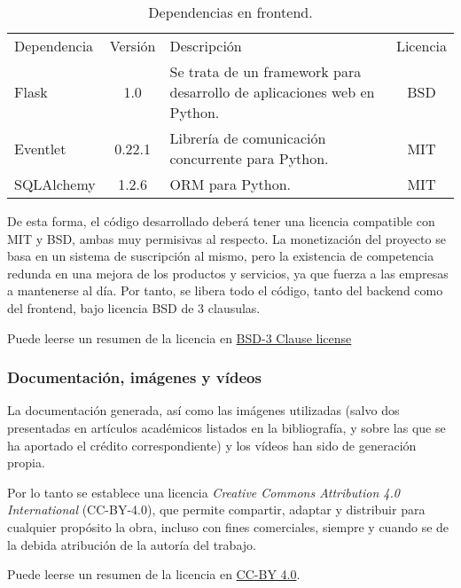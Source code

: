 \begin{table}[H]
\begin{center}
		\begin{tabular}{l | c | m{6cm} | c}\hline
			\toprule
			Dependencia & Versión & Descripción & Licencia\\
			\otoprule
			Flask & 1.0 & Se trata de un framework para desarrollo de aplicaciones web en Python.  & BSD  \\
			Eventlet & 0.22.1 & Librería de comunicación concurrente para Python.  & MIT\\
			SQLAlchemy & 1.2.6 & ORM para Python. & MIT\\
			\hline
			\bottomrule
		\end{tabular}
		\caption{Dependencias en frontend.}
		\label{tb:licensefrontend}
		\end{center}
\end{table}

De esta forma, el código desarrollado deberá tener una licencia compatible con MIT y BSD, ambas muy permisivas al respecto. 
La monetización del proyecto se basa en un sistema de suscripción al mismo, pero la existencia de competencia redunda en una mejora de los productos y servicios, ya que fuerza a las empresas a mantenerse al día.
Por tanto, se libera todo el código, tanto del backend como del frontend, bajo licencia BSD de 3 clausulas.

Puede leerse un resumen de la licencia en \href{https://opensource.org/licenses/BSD-3-Clause}{BSD-3 Clause license}

\subsubsection{Documentación, imágenes y vídeos}

La documentación generada, así como las imágenes utilizadas (salvo dos presentadas en artículos académicos listados en la bibliografía, y sobre las que se ha aportado el crédito correspondiente) y los vídeos han sido de generación propia. 

Por lo tanto se establece una licencia \emph{Creative Commons Attribution 4.0 International} (CC-BY-4.0), que permite compartir, adaptar y distribuir para cualquier propósito la obra, incluso con fines comerciales, siempre y cuando se de la debida atribución de la autoría del trabajo.

Puede leerse un resumen de la licencia en \href{https://creativecommons.org/licenses/by/4.0/}{CC-BY 4.0}. 


